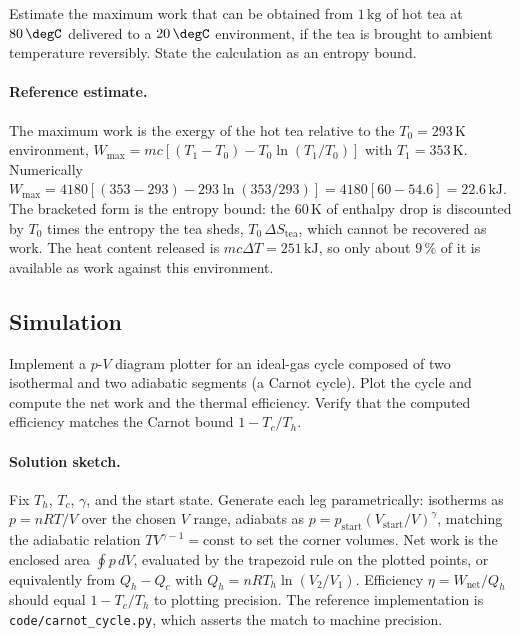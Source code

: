\begin{exercise}
Estimate the maximum work that can be obtained from $1\,\text{kg}$ of
hot tea at $80\,\degC$ delivered to a $20\,\degC$ environment, if the
tea is brought to ambient temperature reversibly. State the
calculation as an entropy bound.
\paragraph{Reference estimate.} The maximum work is the exergy of the
hot tea relative to the $T_0 = 293\,\si{\kelvin}$ environment,
$W_{\max} = mc[(T_1 - T_0) - T_0\ln(T_1/T_0)]$ with $T_1 = 353\,
\si{\kelvin}$. Numerically
$W_{\max} = 4180[(353-293) - 293\ln(353/293)] = 4180[60 - 54.6] =
22.6\,\text{kJ}$. The bracketed form is the entropy bound: the
$60\,\si{\kelvin}$ of enthalpy drop is discounted by $T_0$ times the
entropy the tea sheds, $T_0\,\Delta S_{\text{tea}}$, which cannot be
recovered as work. The heat content released is $mc\Delta T =
251\,\text{kJ}$, so only about $9\,\%$ of it is available as work
against this environment.
\end{exercise}

\subsection*{Simulation}

\begin{exercise}
Implement a $p$-$V$ diagram plotter for an ideal-gas cycle composed of
two isothermal and two adiabatic segments (a Carnot cycle). Plot the
cycle and compute the net work and the thermal efficiency. Verify
that the computed efficiency matches the Carnot bound $1 - T_c/T_h$.
\paragraph{Solution sketch.} Fix $T_h$, $T_c$, $\gamma$, and the start
state. Generate each leg parametrically: isotherms as $p = nRT/V$ over
the chosen $V$ range, adiabats as $p = p_{\text{start}}(V_{\text{start}}
/V)^\gamma$, matching the adiabatic relation $T V^{\gamma-1} =
\text{const}$ to set the corner volumes. Net work is the enclosed area
$\oint p\,dV$, evaluated by the trapezoid rule on the plotted points,
or equivalently from $Q_h - Q_c$ with $Q_h = nRT_h\ln(V_2/V_1)$.
Efficiency $\eta = W_{\text{net}}/Q_h$ should equal $1 - T_c/T_h$ to
plotting precision. The reference implementation is
\texttt{code/carnot\_cycle.py}, which asserts the match to machine
precision.
\end{exercise}

